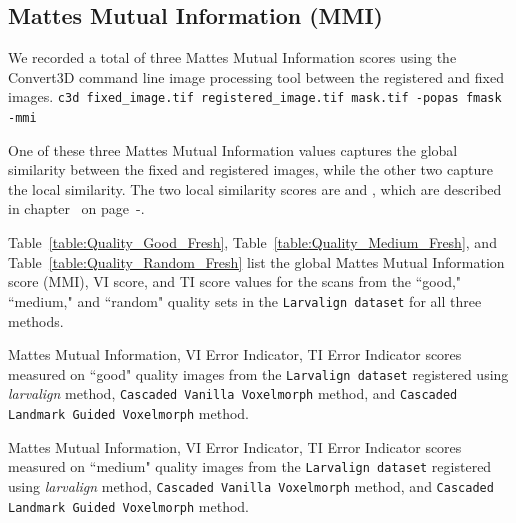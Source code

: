 \documentclass{book}
\begin{document}

	\subsection{Mattes Mutual Information (MMI)}
	We recorded a total of three Mattes Mutual Information \cite{mattes} scores using the Convert3D command line image processing tool between the registered and fixed images. \newline
	\verb|c3d fixed_image.tif registered_image.tif mask.tif -popas fmask -mmi|
	
	One of these three Mattes Mutual Information values captures the global similarity between the fixed and registered images, while the other two capture the local similarity. The two local similarity scores are  and , which are described in chapter~ on page~\pageref{subsubsec:vi}-\pageref{subsubsec:ti}.
	
	Table~\ref{table:Quality_Good_Fresh}, Table~\ref{table:Quality_Medium_Fresh}, and Table~\ref{table:Quality_Random_Fresh} list the global Mattes Mutual Information score (MMI), VI score, and TI score values for the scans from the ``good," ``medium," and ``random" quality sets in the \texttt{Larvalign dataset} for all three methods.

	\begin{table}[h!]
		\centering
		
		\caption{Mattes Mutual Information, VI Error Indicator, TI Error Indicator scores measured on ``good" quality images from the \texttt{Larvalign dataset} registered using \emph{larvalign} method, \texttt{Cascaded Vanilla Voxelmorph} method, and \texttt{Cascaded Landmark Guided Voxelmorph} method.}
		\label{table:Quality_Good_Fresh}
	\end{table}

	\begin{table}[h!]
		\centering
		
		\caption{Mattes Mutual Information, VI Error Indicator, TI Error Indicator scores measured on ``medium" quality images from the \texttt{Larvalign dataset} registered using \emph{larvalign} method, \texttt{Cascaded Vanilla Voxelmorph} method, and \texttt{Cascaded Landmark Guided Voxelmorph} method.}
		\label{table:Quality_Medium_Fresh}
	\end{table}
\end{document}
